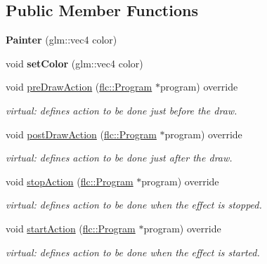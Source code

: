 \subsection*{Public Member Functions}
\begin{DoxyCompactItemize}
\item 
\mbox{\label{classflw_1_1flf_1_1Painter_a4999a420255c4391e9d515abadcee395}} 
{\bfseries Painter} (glm\+::vec4 color)
\item 
\mbox{\label{classflw_1_1flf_1_1Painter_a5a682f895dec9a1fa7c6642116c2ed95}} 
void {\bfseries set\+Color} (glm\+::vec4 color)
\item 
void \hyperlink{classflw_1_1flf_1_1Painter_a92e72e8875c374e4fc118cbd9e003dd5}{pre\+Draw\+Action} (\hyperlink{classflw_1_1flc_1_1Program}{flc\+::\+Program} $\ast$program) override
\begin{DoxyCompactList}\small\item\em virtual\+: defines action to be done just before the draw. \end{DoxyCompactList}\item 
void \hyperlink{classflw_1_1flf_1_1Painter_a18960e396393ce9b3fd0d8cc91fc6864}{post\+Draw\+Action} (\hyperlink{classflw_1_1flc_1_1Program}{flc\+::\+Program} $\ast$program) override
\begin{DoxyCompactList}\small\item\em virtual\+: defines action to be done just after the draw. \end{DoxyCompactList}\item 
void \hyperlink{classflw_1_1flf_1_1Painter_a8ab637228dbefe1befaa92825507ad0e}{stop\+Action} (\hyperlink{classflw_1_1flc_1_1Program}{flc\+::\+Program} $\ast$program) override
\begin{DoxyCompactList}\small\item\em virtual\+: defines action to be done when the effect is stopped. \end{DoxyCompactList}\item 
void \hyperlink{classflw_1_1flf_1_1Painter_aa5104b3f3db56f13d93172203f6fa105}{start\+Action} (\hyperlink{classflw_1_1flc_1_1Program}{flc\+::\+Program} $\ast$program) override
\begin{DoxyCompactList}\small\item\em virtual\+: defines action to be done when the effect is started. \end{DoxyCompactList}\end{DoxyCompactItemize}


